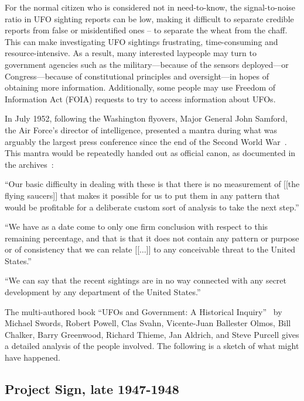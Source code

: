 For the normal citizen who is considered not in need-to-know, the signal-to-noise ratio in UFO sighting reports can be low,
making it difficult to separate credible reports from false or misidentified ones -- to separate the wheat from the chaff.
This can make investigating UFO sightings frustrating, time-consuming and resource-intensive.
As a result, many interested laypeople may turn to government agencies such as the military---because of the sensors deployed---or
Congress---because of constitutional principles and oversight---in hopes of obtaining more information. Additionally, some people may use Freedom of Information Act (FOIA) requests to try to access information about UFOs.



In July 1952, following the Washington flyovers, Major General John Samford, the Air Force's director of intelligence, presented a mantra during what was arguably the largest press conference since the end of the Second World War~\cite{Lewis-Kraus2021Apr}. This mantra would be repeatedly handed out as official canon, as documented in the archives~\cite{Archives1952}:
\begin{svgraybox}
``Our basic difficulty in dealing with these is that there is no measurement of [[the flying saucers]]
that makes it possible for us to put them in any pattern that would be profitable for a deliberate custom sort of analysis to take the next step.''

``We have as a date come to only one firm conclusion with respect to this remaining percentage,
and that is that it does not contain any pattern or purpose or of consistency
that we can relate [[$\ldots$]] to any conceivable threat to the United States.''

``We can say that the recent sightings are in no way connected with any secret development by any department of the United States.''
\end{svgraybox}

The multi-authored book ``{UFO}s and Government: {A} Historical Inquiry''~\cite{Swords2012Jul}
by Michael Swords,  Robert Powell,  Clas Svahn, Vicente-Juan Ballester Olmos,
Bill Chalker,  Barry Greenwood,
Richard Thieme,  Jan Aldrich, and Steve Purcell gives a detailed analysis of the people involved.
The following is a sketch of what might have happened.

\subsection{Project Sign, late 1947-1948}
\label{2023-UFO-part-Perception-types-USA-Sign}



